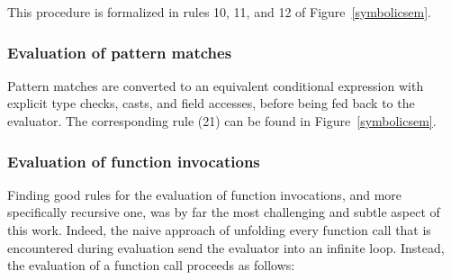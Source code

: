 \documentclass[a4paper,twoside]{article}
\newcommand{\RefFig}[1]{Figure~\ref{#1}}
\begin{document}
This procedure is formalized in rules 10, 11, and 12 of \RefFig{symbolicsem}.

\subsubsection*{Evaluation of pattern matches}

Pattern matches are converted to an equivalent conditional expression with explicit type checks, casts, and field accesses, before being fed back to the evaluator. The corresponding rule (21) can be found in \RefFig{symbolicsem}.

\subsubsection*{Evaluation of function invocations}

Finding good rules for the evaluation of function invocations, and more specifically recursive one, was by far the most challenging and subtle aspect of this work. Indeed, the naive approach of unfolding every function call that is encountered during evaluation send the evaluator into an infinite loop. Instead, the evaluation of a function call proceeds as follows:
\end{document}
